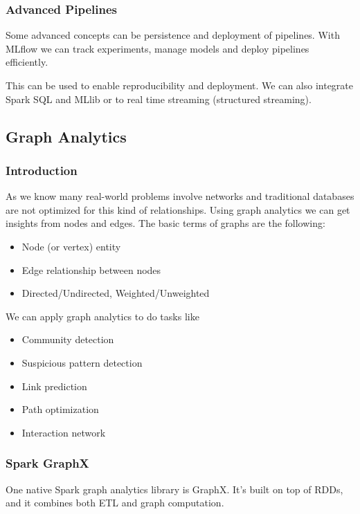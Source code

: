 \subsubsection{Advanced Pipelines}

Some advanced concepts can be persistence and deployment of pipelines. With MLflow we can track experiments, manage models and deploy pipelines efficiently.

This can be used to enable reproducibility and deployment. We can also integrate Spark SQL and MLlib or to real time streaming (structured streaming). 

\subsection{Graph Analytics}

\subsubsection{Introduction}

As we know many real-world problems involve networks and traditional databases are not optimized for this kind of relationships. Using graph analytics we can get insights from nodes and edges. The basic terms of graphs are the following:
\begin{itemize}
    \item Node (or vertex) \ra entity
    \item Edge \ra relationship between nodes
    \item Directed/Undirected, Weighted/Unweighted
\end{itemize}

We can apply graph analytics to do tasks like
\begin{itemize}
    \item Community detection
    \item Suspicious pattern detection
    \item Link prediction
    \item Path optimization
    \item Interaction network
\end{itemize}


\subsubsection{Spark GraphX}

One native Spark graph analytics library is GraphX. It's built on top of RDDs, and it combines both ETL and graph computation. 

